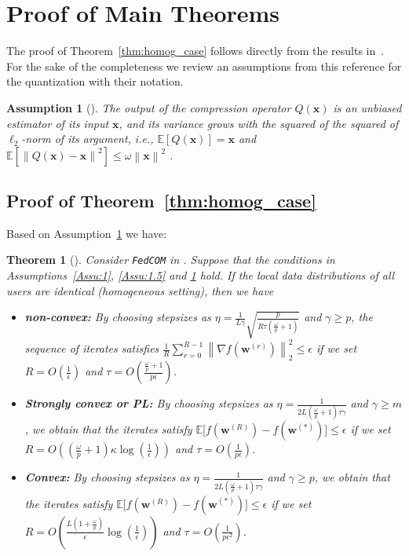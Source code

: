 \documentclass[twoside]{article}
\newtheorem{theorem}{Theorem}
\newtheorem{assumption}{Assumption}
\begin{document}
\newpage




\newpage
\section{Proof of Main Theorems}
The proof of Theorem~\ref{thm:homog_case} follows directly from the results in~\cite{haddadpour2020federated}. For the sake of the completeness we review an assumptions from this reference for the quantization with their notation.

\begin{assumption}[\cite{haddadpour2020federated}]\label{Assu:quant}
The output of the compression operator $Q(\mathbf{x})$ is an unbiased estimator of its input $\mathbf{x}$, and its variance grows with the squared of the squared of $\ell_2$-norm of its argument, i.e., $\mathbb{E}\left[Q(\mathbf{x})\right]=\mathbf{x}$ and $\mathbb{E}\left[\left\|Q(\mathbf{x})-\mathbf{x}\right\|^2\right]\leq \omega\left\|\mathbf{x}\right\|^2$ .
\end{assumption}


\subsection{Proof of Theorem~\ref{thm:homog_case}}
Based on Assumption~\ref{Assu:quant} we have:
\begin{theorem}[\cite{haddadpour2020federated}]\label{thm:fromhaddad}
 Consider \texttt{FedCOM} in \cite{haddadpour2020federated}. Suppose that the conditions in Assumptions~\ref{Assu:1}, \ref{Assu:1.5} and \ref{Assu:quant} hold. If the local data distributions of all users are identical (homogeneous setting), then we have  
 \begin{itemize}
     \item \textbf{non-convex:}  By choosing stepsizes as $\eta=\frac{1}{L\gamma}\sqrt{\frac{p}{R\tau\left(\frac{\omega}{p}+1\right)}}$ and $\gamma\geq p$, the sequence of iterates satisfies  $\frac{1}{R}\sum_{r=0}^{R-1}\left\|\nabla f({\boldsymbol{w}}^{(r)})\right\|_2^2\leq {\epsilon}$ if we set
     $R=O\left(\frac{1}{\epsilon}\right)$ and $ \tau=O\left(\frac{\frac{\omega}{p}+1}{{p}\epsilon}\right)$.
     \item \textbf{Strongly convex or PL:}
      By choosing stepsizes as $\eta=\frac{1}{2L\left(\frac{\omega}{p}+1\right)\tau\gamma}$ and $\gamma\geq m$, we obtain that the iterates satisfy $\mathbb{E}\Big[f({\boldsymbol{w}}^{(R)})-f({\boldsymbol{w}}^{(*)})\Big]\leq \epsilon$ if  we set
     $R=O\left(\left(\frac{\omega}{p}+1\right)\kappa\log\left(\frac{1}{\epsilon}\right)\right)$ and $ \tau=O\left(\frac{1}{p\epsilon}\right)$.
     \item \textbf{Convex:} By choosing stepsizes as $\eta=\frac{1}{2L\left(\frac{\omega}{p}+1\right)\tau\gamma}$ and $\gamma\geq p$, we obtain that the iterates satisfy $ \mathbb{E}\Big[f({\boldsymbol{w}}^{(R)})-f({\boldsymbol{w}}^{(*)})\Big]\leq \epsilon$ if we set
     $R=O\left(\frac{L\left(1+\frac{\omega}{p}\right)}{\epsilon}\log\left(\frac{1}{\epsilon}\right)\right)$ and $ \tau=O\left(\frac{1}{p\epsilon^2}\right)$.
 \end{itemize}
\end{theorem}
\end{document}
